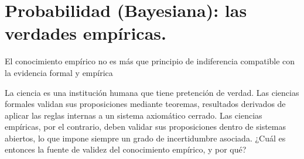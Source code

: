 \documentclass[a4paper,10pt]{book}
\theoremstyle{definition}
\begin{document}
% 
% 
% 
% 
% 
% 
% 
% 
% 






























































\chapter{Probabilidad (Bayesiana): las verdades empíricas.} \label{ch:proba}

\epigraph{El conocimiento empírico no es más que principio de indiferencia compatible con la evidencia formal y empírica}{}

La ciencia es una institución humana que tiene pretención de verdad.
%
Las ciencias formales validan sus proposiciones mediante teoremas, resultados derivados de aplicar las reglas internas a un sistema axiomático cerrado.
%
Las ciencias empíricas, por el contrario, deben validar sus proposiciones dentro de sistemas abiertos, lo que impone siempre un grado de incertidumbre asociada.
%
¿Cuál es entonces la fuente de validez del conocimiento empírico, y por qué?
\end{document}
